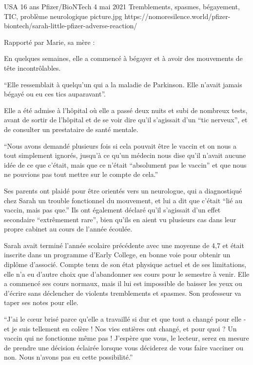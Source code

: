 
{USA}
{16 ans}
{Pfizer/BioNTech}
{4 mai 2021}
{Tremblements, spasmes, bégayement, TIC, problème neurologique}
{picture.jpg}
{https://nomoresilence.world/pfizer-biontech/sarah-little-pfizer-adverse-reaction/}
{

Rapporté par Marie, sa mère :

En quelques semaines, elle a commencé à bégayer et à avoir des mouvements de
tête incontrôlables.

“Elle ressemblait à quelqu'un qui a la maladie de Parkinson. Elle n'avait jamais
bégayé ou eu ces tics auparavant”.

Elle a été admise à l'hôpital où elle a passé deux nuits et subi de nombreux
tests, avant de sortir de l'hôpital et de se voir dire qu'il s'agissait d'un
“tic nerveux”, et de consulter un prestataire de santé mentale.

“Nous avons demandé plusieurs fois si cela pouvait être le vaccin et on nous a
tout simplement ignorés, jusqu'à ce qu'un médecin nous dise qu'il n'avait aucune
idée de ce que c'était, mais que ce n'était “absolument pas le vaccin” et que
nous ne pouvions pas tout mettre sur le compte de cela.”

Ses parents ont plaidé pour être orientés vers un neurologue, qui a diagnostiqué
chez Sarah un trouble fonctionnel du mouvement, et lui a dit que c'était “lié au
vaccin, mais pas que.” Ils ont également déclaré qu'il s'agissait d'un effet
secondaire “extrêmement rare”, bien qu'ils en aient vu plusieurs cas dans leur
propre cabinet au cours de l'année écoulée.

Sarah avait terminé l'année scolaire précédente avec une moyenne de 4,7 et était
inscrite dans un programme d'Early College, en bonne voie pour obtenir un
diplôme d'associé. Compte tenu de son état physique actuel et de ses
limitations, elle n'a eu d'autre choix que d'abandonner ses cours pour le
semestre à venir. Elle a commencé ses cours normaux, mais il lui est impossible
de baisser les yeux ou d'écrire sans déclencher de violents tremblements et
spasmes. Son professeur va taper ses notes pour elle.

“J'ai le cœur brisé parce qu'elle a travaillé si dur et que tout a changé pour
elle - et je suis tellement en colère ! Nos vies entières ont changé, et pour
quoi ? Un vaccin qui ne fonctionne même pas ! J'espère que vous, le lecteur,
serez en mesure de prendre une décision éclairée lorsque vous déciderez de vous
faire vacciner ou non. Nous n'avons pas eu cette possibilité.”

}
